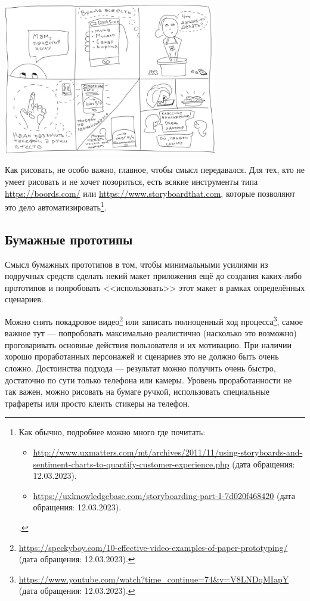 \documentclass{../../text-style}
\begin{document}
\begin{center}
    \includegraphics[width=0.7\textwidth]{storyboardingExample.png}
\end{center}

Как рисовать, не особо важно, главное, чтобы смысл передавался. Для тех, кто не умеет рисовать и не хочет позориться, есть всякие инструменты типа \url{https://boords.com/} или \url{https://www.storyboardthat.com}, которые позволяют это дело автоматизировать\footnote{Как обычно, подробнее можно много где почитать: 
\begin{itemize}
    \item \url{http://www.uxmatters.com/mt/archives/2011/11/using-storyboards-and-sentiment-charts-to-quantify-customer-experience.php} (дата обращения: 12.03.2023).
    \item \url{https://uxknowledgebase.com/storyboarding-part-1-7d020f468420} (дата обращения: 12.03.2023).
\end{itemize}.}.

\subsection{Бумажные прототипы}

Смысл бумажных прототипов в том, чтобы минимальными усилиями из подручных средств сделать некий макет приложения ещё до создания каких-либо прототипов и попробовать <<использовать>> этот макет в рамках определённых сценариев.

Можно снять покадровое видео\footnote{\url{https://speckyboy.com/10-effective-video-examples-of-paper-prototyping/} (дата обращения: 12.03.2023).} или записать полноценный ход процесса\footnote{\url{https://www.youtube.com/watch?time_continue=74&v=V8LNDqMIapY} (дата обращения: 12.03.2023).}, самое важное тут --- попробовать максимально реалистично (насколько это возможно) проговаривать основные действия пользователя и их мотивацию. При наличии хорошо проработанных персонажей и сценариев это не должно быть очень сложно. Достоинства подхода --- результат можно получить очень быстро, достаточно по сути только телефона или камеры. Уровень проработанности не так важен, можно рисовать на бумаге ручкой, использовать специальные трафареты или просто клеить стикеры на телефон.
\end{document}
